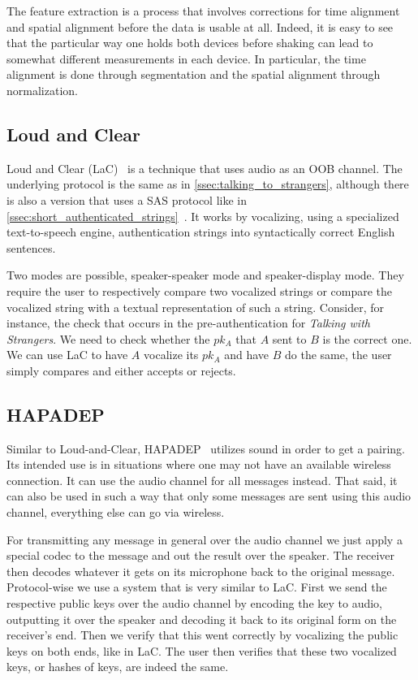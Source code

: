 \documentclass[conference, 11pt]{sty/IEEEtran}
\begin{document}
The feature extraction is a process that involves corrections for time alignment and spatial alignment before the data is usable at all.
Indeed, it is easy to see that the particular way one holds both devices before shaking can lead to somewhat different measurements in each device.
In particular, the time alignment is done through segmentation and the spatial alignment through normalization.

\subsection{Loud and Clear}
\label{ssec:loud_and_clear}

Loud and Clear (LaC)~\cite{goodrich2006loud} is a technique that uses audio as an OOB channel.
The underlying protocol is the same as in \autoref{ssec:talking_to_strangers}, although there is also a version that uses a SAS protocol like in \autoref{ssec:short_authenticated_strings}~\cite{kumar2009comparative}.
It works by vocalizing, using a specialized text-to-speech engine, authentication strings into syntactically correct English sentences.

Two modes are possible, speaker-speaker mode and speaker-display mode.
They require the user to respectively compare two vocalized strings or compare the vocalized string with a textual representation of such a string.
Consider, for instance, the check that occurs in the pre-authentication for \emph{Talking with Strangers}.
We need to check whether the $pk_A$ that $A$ sent to $B$ is the correct one.
We can use LaC to have $A$ vocalize its $pk_A$ and have $B$ do the same, the user simply compares and either accepts or rejects.

\subsection{HAPADEP}
\label{ssec:hapadep}

Similar to Loud-and-Clear, HAPADEP~\cite{soriente2008hapadep} utilizes sound in order to get a pairing.
Its intended use is in situations where one may not have an available wireless connection.
It can use the audio channel for all messages instead.
That said, it can also be used in such a way that only some messages are sent using this audio channel, everything else can go via wireless.

For transmitting any message in general over the audio channel we just apply a special codec to the message and out the result over the speaker.
The receiver then decodes whatever it gets on its microphone back to the original message.
Protocol-wise we use a system that is very similar to LaC.
First we send the respective public keys over the audio channel by encoding the key to audio, outputting it over the speaker and decoding it back to its original form on the receiver's end.
Then we verify that this went correctly by vocalizing the public keys on both ends, like in LaC.
The user then verifies that these two vocalized keys, or hashes of keys, are indeed the same.
\end{document}
